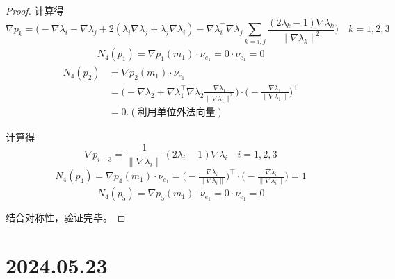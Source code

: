 \documentclass[12pt,a4paper]{article}
\begin{document}
\begin{enumerate}
\begin{proof}
			计算得
			$$
			\nabla p_{k}=\Big(-\nabla\lambda_i-\nabla\lambda_j+2(\lambda_i\nabla\lambda_j+\lambda_j\nabla\lambda_i)-\nabla\lambda_i^\top\nabla\lambda_j\sum_{k=i,j}\frac{(2\lambda_k-1)\nabla\lambda_k}{\|\nabla\lambda_k\|^2}\Big) \quad k = 1,2,3
			$$
			\begin{equation*}
				\begin{aligned}
					N_4(p_1) = \nabla p_1 (m_1) \cdot \nu_{e_1} = 0 \cdot \nu_{e_1} = 0
				\end{aligned}
			\end{equation*}
			\begin{equation*}
				\begin{aligned}
					N_4(p_2) &= \nabla p_2 (m_1) \cdot \nu_{e_1} \\
					&=\Big( -\nabla\lambda_{2}+\nabla\lambda_{1}^{\top}\nabla\lambda_{2}\frac{\nabla\lambda_{1}}{\|\nabla\lambda_{1}\|^{2} } \Big) \cdot  \Big(-\frac{\nabla \lambda_1}{\|\nabla \lambda_1\|}\Big)^\top\\
					&= 0.  (\text{利用单位外法向量})
				\end{aligned}
			\end{equation*}
			
			计算得
			$$\nabla p_{i+3}=\frac{1}{\|\nabla\lambda_i\|}(2\lambda_i-1)\nabla\lambda_i \quad i = 1,2,3$$
			\begin{equation*}
				\begin{aligned}
					N_4(p_4) = \nabla p_4(m_1) \cdot \nu_{e_1} = \Big(-\frac{\nabla \lambda_i}{\|\nabla \lambda_i\|}\Big)^\top\cdot \Big(-\frac{\nabla \lambda_i}{\|\nabla \lambda_i\|}\Big) = 1
				\end{aligned}
			\end{equation*}
			$$N_4(p_5) = \nabla p_5 (m_1) \cdot \nu_{e_1} = 0 \cdot \nu_{e_1} = 0$$
			
			结合对称性，验证完毕。
		\end{proof}
	\end{enumerate}
	
	\newpage
	
	\section*{2024.05.23}	
	
\end{document}
